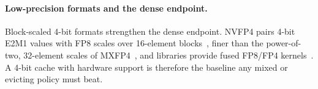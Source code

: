 \paragraph{Low-precision formats and the dense endpoint.}
Block-scaled 4-bit formats strengthen the dense endpoint.  NVFP4 pairs 4-bit
E2M1 values with FP8 scales over 16-element blocks~\citep{alvarez2025nvfp4,nvidia2025nvfp4ways},
finer than the power-of-two, 32-element scales of MXFP4~\citep{ocp2023mx}, and
libraries provide fused FP8/FP4 kernels~\citep{nvidia2024te,nvidia2024modelopt}.
A 4-bit cache with hardware support is therefore the baseline any mixed or
evicting policy must beat.

